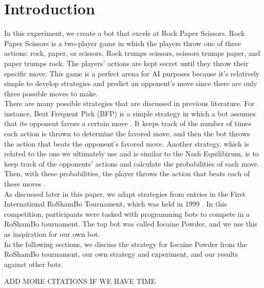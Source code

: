 

\section{Introduction}
\label{sec:intro}

In this experiment, we create a bot that excels at Rock Paper Scissors. Rock Paper Scissors is a two-player game in which the players throw one of three actions: rock, paper, or scissors. Rock trumps scissors, scissors trumps paper, and paper trumps rock. The players' actions are kept secret until they throw their specific move. This game is a perfect arena for AI purposes because it's relatively simple to develop strategies and predict an opponent's move since there are only three possible moves to make. \\

There are many possible strategies that are discussed in previous literature. For instance, Beat Frequent Pick (BFP) is a simple strategy in which a bot assumes that its opponent favors a certain move \cite{iocaine}. It keeps track of the number of times each action is thrown to determine the favored move, and then the bot throws the action that beats the opponent's favored move. Another strategy, which is related to the one we ultimately use and is similar to the Nash Equilibirum, is to keep track of the opponents' actions and calculate the probabilities of each move. Then, with these probabilities, the player throws the action that beats each of these moves \cite{smartrobots}. \\

As discussed later in this paper, we adapt strategies from entries in the First International RoShamBo Tournament, which was held in 1999 \cite{iocaine}. In this competition, participants were tasked with programming bots to compete in a RoShamBo tournament. The top bot was called Iocaine Powder, and we use this as inspiration for our own bot.\\

In the following sections, we discuss the strategy for Iocaine Powder from the RoShamBo tournament, our own strategy and experiment, and our results against other bots.

ADD MORE CITATIONS IF WE HAVE TIME




